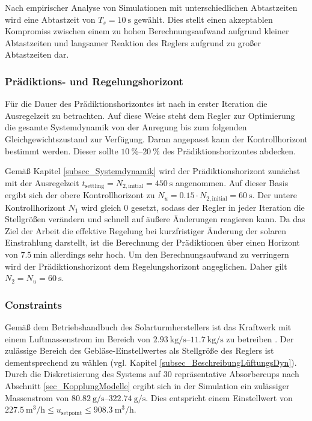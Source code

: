 Nach empirischer Analyse von Simulationen mit unterschiedlichen Abtastzeiten wird eine Abtastzeit von $T_s=\SI{10}{\second}$ gewählt.
Dies stellt einen akzeptablen Kompromiss zwischen einem zu hohen Berechnungsaufwand aufgrund kleiner Abtastzeiten und langsamer Reaktion des Reglers aufgrund zu großer Abtastzeiten dar.


\subsubsection*{Prädiktions- und Regelungshorizont} \label{subsubsec_horizonte}
Für die Dauer des Prädiktionshorizontes ist nach \cite{Bemporad} in erster Iteration die Ausregelzeit zu betrachten.
Auf diese Weise steht dem Regler zur Optimierung die gesamte Systemdynamik von der Anregung bis zum folgenden Gleichgewichtszustand zur Verfügung.
Daran angepasst kann der Kontrollhorizont bestimmt werden.
Dieser sollte $\SIrange{10}{20}{\percent}$ des Prädiktionshorizontes abdecken.

Gemäß Kapitel \ref{subsec_Systemdynamik} wird der Prädiktionshorizont zunächst mit der Ausregelzeit $t_{\mathrm{settling}} = N_{2,\mathrm{initial}} = \SI{450}{\second}$ angenommen.
Auf dieser Basis ergibt sich der obere Kontrollhorizont zu $N_u = 0.15\cdot N_{2,\mathrm{initial}} = \SI{60}{\second}$.
Der untere Kontrollhorizont $N_1$ wird gleich $0$ gesetzt, sodass der Regler in jeder Iteration die Stellgrößen verändern und schnell auf äußere Änderungen reagieren kann.
Da das Ziel der Arbeit die effektive Regelung bei kurzfristiger Änderung der solaren Einstrahlung darstellt, ist die Berechnung der Prädiktionen über einen Horizont von $\SI{7.5}{\minute}$ allerdings sehr hoch.
Um den Berechnungsaufwand zu verringern wird der Prädiktionshorizont dem Regelungshorizont angeglichen.
Daher gilt $N_2 = N_u = \SI{60}{\second}$.

\subsubsection*{Constraints} \label{subsubsec_constraints}
Gemäß dem Betriebshandbuch des Solarturmherstellers ist das Kraftwerk mit einem Luftmassenstrom im Bereich von $\SIrange{2.93}{11.7}{\kilo\gram\per\second}$ zu betreiben \cite[S.28]{HandbuchJülich}.
Der zulässige Bereich des Gebläse-Einstellwertes als Stellgröße des Reglers ist dementsprechend zu wählen (vgl. Kapitel \ref{subsec_BeschreibungLüftungsDyn}).
Durch die Diskretisierung des Systems auf 30 repräsentative Absorbercups nach Abschnitt \ref{sec_KopplungModelle} ergibt sich in der Simulation ein zulässiger Massenstrom von $\SIrange{80.82}{322.74}{\gram\per\second}$.
Dies entspricht einem Einstellwert von $\SI{227.5}{\metre\cubed\per\hour} \leq u_{\mathrm{setpoint}} \leq \SI{908.3}{\metre\cubed\per\hour}$.

